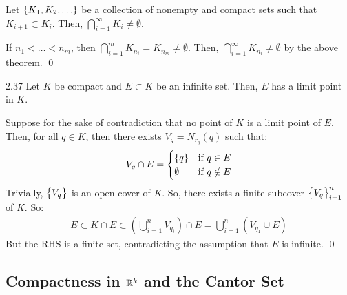 \begin{ncorollary}{}{}
    Let $\set{K_1, K_2, \ldots}$ be a collection of nonempty and compact sets such that $K_{i+1} \subset K_i$. Then, $\bigcap_{i=1}^\infty K_i \neq \emptyset$.
\end{ncorollary}
\begin{nproof}
    If $n_1 < \ldots < n_m$, then $\bigcap_{i=1}^m K_{n_i} = K_{n_m} \neq \emptyset$. Then, $\bigcap_{i=1}^\infty K_{n_i} \neq \emptyset$ by the above theorem. \qed
\end{nproof}

\begin{theorem}{}{2.37}
    Let $K$ be compact and $E \subset K$ be an infinite set. Then, $E$ has a limit point in $K$.
\end{theorem}
\begin{nproof}
    Suppose for the sake of contradiction that no point of $K$ is a limit point of $E$. Then, for all $q \in K$, then there exists $V_q = N_{r_q}(q)$ such that:
    \begin{align*}
        V_q \cap E = \begin{cases}
            \set{q} & \text{if $q \in E$}
            \\ \emptyset & \text{if $q \notin E$}
        \end{cases}
    \end{align*}
    Trivially, $\set{V_q}$ is an open cover of $K$. So, there exists a finite subcover $\set{V_q}_{i=1}^n$ of $K$. So:
    \begin{align*}
        E \subset K \cap E \subset \left(\bigcup_{i=1}^n V_{q_i}\right) \cap E = \bigcup_{i=1}^n(V_{q_1} \cup E)
    \end{align*}
    But the RHS is a finite set, contradicting the assumption that $E$ is infinite. \qed
\end{nproof}

\subsection{Compactness in \texorpdfstring{$\mathbb{R}^k$}{TEXT} and the Cantor Set}
